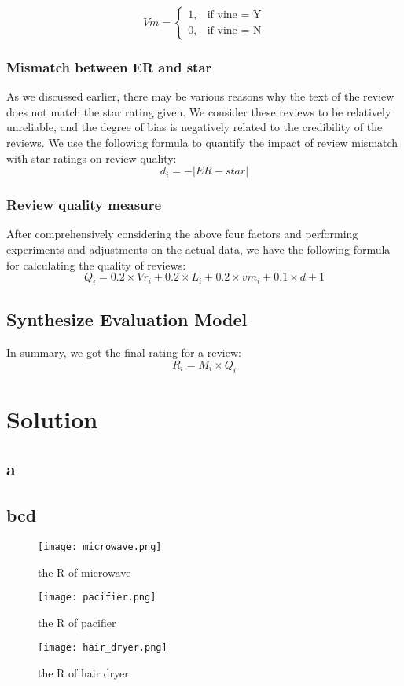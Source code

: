 \documentclass{mcmthesis}
\begin{document}
\[
Vm = 
\begin{cases}  
	1, &\text{if vine = Y} \\
	0, &\text{if vine = N}
\end{cases}
\]

\subsubsection{ Mismatch between ER and star}
As we discussed earlier, there may be various reasons why the text of the review does not match the star rating given. We consider these reviews to be relatively unreliable, and the degree of bias is negatively related to the credibility of the reviews. We use the following formula to quantify the impact of review mismatch with star ratings on review quality:
\[
	d_{i}  = -|ER - star|
\]

\subsubsection{Review quality measure}
After comprehensively considering the above four factors and performing experiments and adjustments on the actual data, we have the following formula for calculating the quality of reviews:
\[
Q_i = 0.2 \times Vr_i + 0.2 \times L_i + 0.2 \times vm_i + 0.1 \times d + 1
\]

\subsection{Synthesize Evaluation Model}
In summary, we got the final rating for a review:
\[
 R_i = M_i \times Q_i
\]

\section{ Solution }

\subsection{a}
\subsection{bcd}
\begin{figure}[h]
  \small
  \centering
  \texttt{[image: microwave.png]}
  \caption{the R of microwave}
\end{figure}
\begin{figure}[h]
  \small
  \centering
  \texttt{[image: pacifier.png]}
  \caption{the R of pacifier}
\end{figure}
\begin{figure}[h]
  \small
  \centering
  \texttt{[image: hair\_dryer.png]}
  \caption{the R of hair dryer}
\end{figure}
\end{document}
